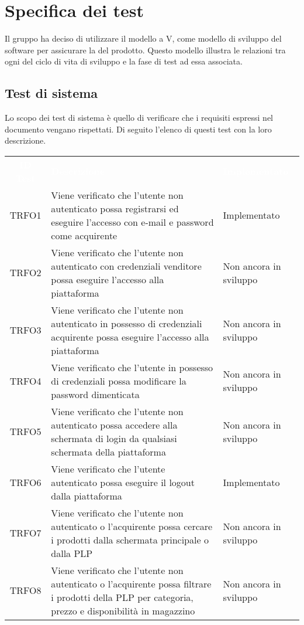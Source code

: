 \section{Specifica dei test}
\label{specificatest}
Il gruppo ha deciso di utilizzare il modello a V, come modello di sviluppo del software per assicurare la  del prodotto. Questo modello illustra le relazioni tra ogni  del ciclo di vita di sviluppo e la fase di test ad essa associata.
\subsection{Test di sistema}
Lo scopo dei test di sistema è quello di verificare che i requisiti espressi nel documento  vengano rispettati. Di seguito l'elenco di questi test con la loro descrizione.
\begin{longtable}{|c| C{10cm} |C{3cm}|}
	\textcolor{white}{\textbf{ID Test}}&
	\textcolor{white}{\textbf{Descrizione}}&
	\textcolor{white}{\textbf{Implementato}}\label{tab:TestSistema1}\\
	TRFO1 & Viene verificato che l'utente non autenticato possa registrarsi ed eseguire l'accesso  con e-mail e password come acquirente & Implementato\\ \hline
	TRFO2 & Viene verificato che l'utente non autenticato con credenziali venditore possa eseguire l'accesso alla piattaforma & Non ancora in sviluppo\\ \hline
	TRFO3 & Viene verificato che l'utente non autenticato in possesso di credenziali acquirente possa eseguire l'accesso alla piattaforma & Non ancora in sviluppo \\ \hline
	TRFO4 & Viene verificato che l'utente in possesso di credenziali possa modificare la password dimenticata & Non ancora in sviluppo\\ \hline
	TRFO5 & Viene verificato che l'utente non autenticato possa accedere alla schermata di login da qualsiasi schermata della piattaforma & Non ancora in sviluppo\\ \hline
	TRFO6 & Viene verificato che l'utente autenticato possa eseguire il logout dalla piattaforma & Implementato\\ \hline
	TRFO7 & Viene verificato che l'utente non autenticato o l'acquirente possa cercare i prodotti dalla schermata principale o dalla PLP & Non ancora in sviluppo\\ \hline
	TRFO8 & Viene verificato che l'utente non autenticato o l'acquirente possa filtrare i prodotti della PLP per categoria, prezzo e disponibilità in magazzino & Non ancora in sviluppo\\ \hline

\end{longtable}
